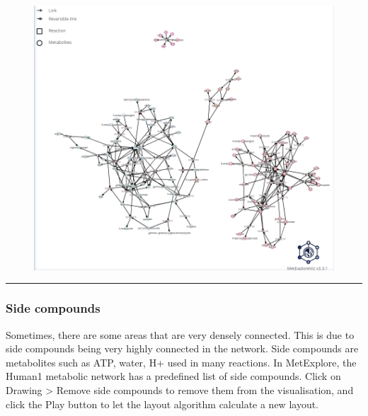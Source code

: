 \documentclass[
  24px,
  letterpaper,
  DIV=11,
  numbers=noendperiod]{scrartcl}
\begin{document}
\begin{figure}

{\centering \includegraphics{images/metexplore_viz_1.png}

}

\end{figure}

\begin{center}\rule{0.5\linewidth}{0.5pt}\end{center}

\hypertarget{side-compounds}{%
\subsubsection{Side compounds}\label{side-compounds}}

Sometimes, there are some areas that are very densely connected. This is
due to side compounds being very highly connected in the network. Side
compounds are metabolites such as ATP, water, H+ used in many reactions.
In MetExplore, the Human1 metabolic network has a predefined list of
side compounds. Click on Drawing \textgreater{} Remove side compounds to
remove them from the visualisation, and click the Play button to let the
layout algorithm calculate a new layout.
\end{document}
